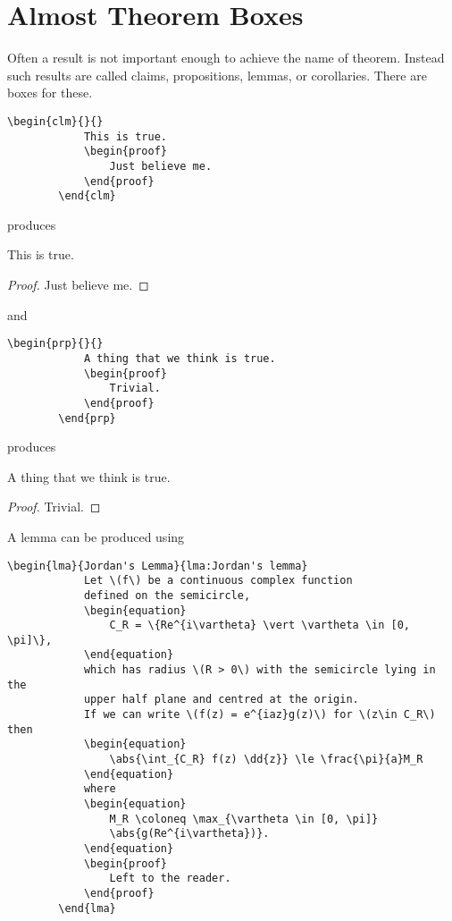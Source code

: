 \documentclass[fleqn, a4paper, openany]{memoir}
\begin{document}
    \section{Almost Theorem Boxes}
    Often a result is not important enough to achieve the name of theorem.
    Instead such results are called claims, propositions, lemmas, or corollaries.
    There are boxes for these.
    \begin{Verbatim}[gobble=2]
        \begin{clm}{}{}
            This is true.
            \begin{proof}
                Just believe me.
            \end{proof}
        \end{clm}
    \end{Verbatim}
    produces
    \begin{clm}{}{}
        This is true.
        \begin{proof}
            Just believe me.
        \end{proof}
    \end{clm}
    and
    \begin{Verbatim}[gobble=2]
        \begin{prp}{}{}
            A thing that we think is true.
            \begin{proof}
                Trivial.
            \end{proof}
        \end{prp}
    \end{Verbatim}
    produces
    \begin{prp}{}{}
        A thing that we think is true.
        \begin{proof}
            Trivial.
        \end{proof}
    \end{prp}
    A lemma can be produced using
    \begin{Verbatim}[gobble=2]
        \begin{lma}{Jordan's Lemma}{lma:Jordan's lemma}
            Let \(f\) be a continuous complex function
            defined on the semicircle,
            \begin{equation}
                C_R = \{Re^{i\vartheta} \vert \vartheta \in [0, \pi]\},
            \end{equation}
            which has radius \(R > 0\) with the semicircle lying in the
            upper half plane and centred at the origin.
            If we can write \(f(z) = e^{iaz}g(z)\) for \(z\in C_R\) then
            \begin{equation}
                \abs{\int_{C_R} f(z) \dd{z}} \le \frac{\pi}{a}M_R
            \end{equation}
            where
            \begin{equation}
                M_R \coloneq \max_{\vartheta \in [0, \pi]}
                \abs{g(Re^{i\vartheta})}.
            \end{equation}
            \begin{proof}
                Left to the reader.
            \end{proof}
        \end{lma}
    \end{Verbatim}
\end{document}

